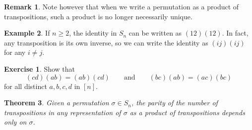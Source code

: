 \documentclass[12pt]{report}
\newtheorem{theorem}{Theorem}[chapter]
\numberwithin{equation}{section}
\numberwithin{theorem}{chapter}
\theoremstyle{definition}
\newtheorem{example}[theorem]{Example}
\newtheorem{exercise}{Exercise}
\newtheorem*{basic properties}{Basic Properties}
\newtheorem*{Important Remark}{Important Remark}
\newtheorem{remark}[theorem]{Remark}
\begin{document}
\begin{remark}
	Note however that when we write a permutation as a product of transpositions, such a product is no longer necessarily unique.
\end{remark}





\begin{example}\label{every transposition is its own inverse}
	If $n \geqslant 2$, the identity in $S_n$ can be written as $(1 2) (1 2)$. In fact, any transposition is its own inverse, so we can write the identity as $(i j)(i j)$ for any $i \neq j$.
\end{example}


\begin{exercise}\label{exercise for parity well-defined}
Show that 
	$$(cd)(ab) = (ab)(cd) \qquad \textrm{and} \qquad (bc)(ab) = (ac)(bc)$$
	for all distinct $a, b, c, d$ in $[n]$.
\end{exercise}

\begin{theorem}\label{sign of a permutation is well-defined}
	Given a permutation $\sigma \in S_n$, the parity of the number of transpositions in any representation of $\sigma$ as a product of transpositions depends only on $\sigma$.
\end{theorem}
\end{document}
